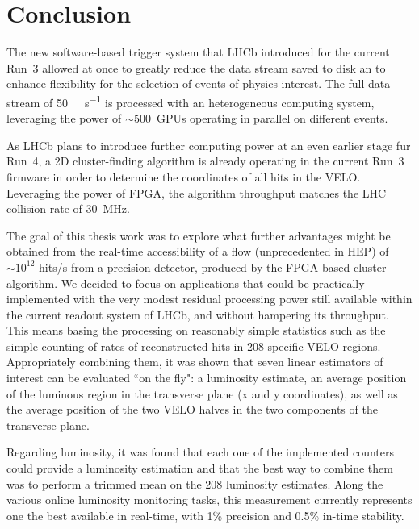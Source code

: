 
\chapter{Conclusion}
\label{chp:conclusion}
The new software-based trigger system that LHCb introduced for the current Run~3 allowed at once to greatly reduce the data stream saved to disk an to enhance flexibility for the selection of events of physics interest. The full data stream of \SI{50}{\tera\byte\per\second} is processed with an heterogeneous computing system, leveraging the power of $\sim 500$~GPUs operating in parallel on different events.

As LHCb plans to introduce further computing power at an even earlier stage fur Run~4, a 2D cluster-finding algorithm is already operating in the current Run~3 firmware in order to determine the coordinates of all hits in the VELO. Leveraging the power of FPGA, the algorithm throughput matches the LHC collision rate of \SI{30}{\mega\hertz}.

The goal of this thesis work was to explore what further advantages might be obtained from the real-time accessibility of a flow (unprecedented in HEP) of $\sim 10^{12}$ hits/s from a precision detector, produced by the FPGA-based cluster algorithm. We decided to focus on applications that could be practically implemented with the very modest residual processing power still available within the current readout system of LHCb, and without hampering its throughput. This means basing the processing on reasonably simple statistics such as the simple counting of rates of reconstructed hits in 208 specific VELO regions. Appropriately combining them, it was shown that seven linear estimators of interest can be evaluated ``on the fly": a luminosity estimate, an average position of the luminous region in the transverse plane (x and y coordinates), as well as the average position of the two VELO halves in the two components of the transverse plane.

Regarding luminosity, it was found that each one of the implemented counters could provide a luminosity estimation and that the best way to combine them was to perform a trimmed mean on the 208 luminosity estimates. Along the various online luminosity monitoring tasks, this measurement currently represents one the best available in real-time, with 1\% precision and 0.5\% in-time stability. 

